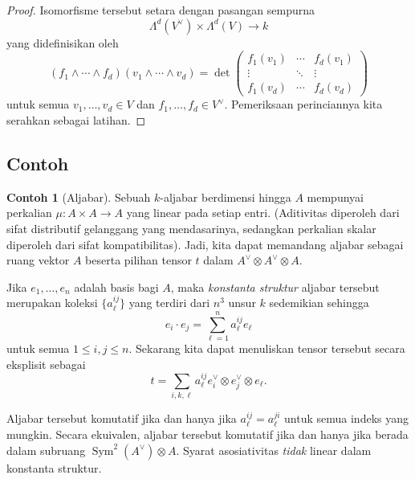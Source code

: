 \documentclass[12pt]{article}
\theoremstyle{plain}
\theoremstyle{definition}
\newtheorem{example}[theorem]{Contoh}
\theoremstyle{remark}
\numberwithin{equation}{section}
\begin{document}
\begin{proof}
Isomorfisme tersebut setara dengan pasangan sempurna
\[
\Lambda^d(V^\vee) \times \Lambda^d(V) \to k
\]
yang didefinisikan oleh
\[
(f_1 \wedge \cdots \wedge f_d)(v_1 \wedge \cdots \wedge v_d)
= \det \begin{pmatrix}
f_1(v_1) & \cdots & f_d(v_1)\\
\vdots & \ddots & \vdots\\
f_1(v_d) & \cdots & f_d(v_d)
\end{pmatrix} 
\]
untuk semua $v_1,\ldots, v_d \in V$ dan $f_1,\ldots, f_d \in V^\vee$.
Pemeriksaan perinciannya kita serahkan sebagai latihan.
\end{proof}

\subsection{Contoh}

\begin{example}[Aljabar]
Sebuah $k$-aljabar berdimensi hingga $A$ mempunyai perkalian $\mu: A \times
A \to A$ yang linear pada setiap entri.
(Aditivitas diperoleh dari sifat distributif gelanggang yang mendasarinya,
sedangkan perkalian skalar diperoleh dari sifat kompatibilitas).
Jadi, kita dapat memandang aljabar sebagai ruang vektor $A$
beserta pilihan tensor $t$ dalam $A^\vee \otimes A^\vee \otimes A$.

Jika $e_1,\ldots,e_n$ adalah basis bagi $A$,
maka \emph{konstanta struktur} aljabar tersebut
merupakan koleksi $\{ a^{ij}_\ell\}$ yang terdiri dari $n^3$ unsur $k$ sedemikian sehingga
\[
e_i\cdot e_j = \sum_{\ell=1}^n a^{ij}_\ell e_\ell
\]
untuk semua $1 \le i,j \le n$.
Sekarang kita dapat menuliskan tensor tersebut secara eksplisit sebagai
\[
t = \sum_{i,k,\ell} a^{ij}_\ell e_i^\vee \otimes e_j^\vee \otimes
e_\ell.
\]

Aljabar tersebut komutatif jika dan hanya jika $a^{ij}_\ell=a^{ji}_\ell$
untuk semua indeks yang mungkin. Secara ekuivalen, aljabar tersebut komutatif jika
dan hanya jika berada dalam subruang $\operatorname{Sym}^2(A^\vee) \otimes A$.
Syarat asosiativitas \emph{tidak} linear dalam konstanta
struktur. 
\end{example}
\end{document}
